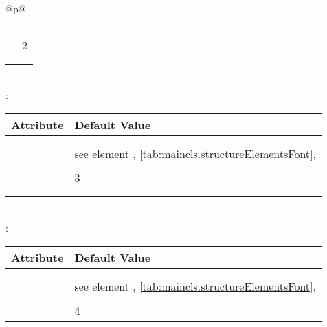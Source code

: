 \begin{longtable}{@{}p{\columnwidth}@{}}
\begin{tabularx}{\linewidth}{ll}
                           \autopageref{tab:maincls.structureElementsFont} \\
    \PValue{indent}      & \PValue{0pt} \\
    \PValue{level}       & 2 \\
    \PValue{tocindent}   & \PValue{3.8em}\\
    \PValue{tocnumwidth} & \PValue{3.2em}\\
    \bottomrule
    \end{tabularx} \\
    \addlinespace[\normalbaselineskip]
    : \\*
    \begin{tabularx}{\linewidth}{ll}
    \toprule
    Attribute & Default Value \\
    \midrule\nopagebreak
    \PValue{afterskip}   & \PValue{1.5ex plus .2ex} \\
    \PValue{beforeskip}  & \PValue{-3.25ex plus -1ex minus -.2ex} \\
    \PValue{font}        & see element \FontElement{subsubsection},
                           \autoref{tab:maincls.structureElementsFont}, 
                           \autopageref{tab:maincls.structureElementsFont} \\
    \PValue{indent}      & \PValue{0pt} \\
    \PValue{level}       & 3 \\
    \PValue{tocindent}   & \PValue{7.0em}\\
    \PValue{tocnumwidth} & \PValue{4.1em}\\
    \bottomrule
    \end{tabularx} \\
    \addlinespace[\normalbaselineskip]
    : \\*
    \begin{tabularx}{\linewidth}{ll}
    \toprule
    Attribute & Default Value \\
    \midrule\nopagebreak
    \PValue{afterskip}   & \PValue{-1em} \\
    \PValue{beforeskip}  & \PValue{3.25ex plus 1ex minus .2ex} \\
    \PValue{font}        & see element \FontElement{paragraph},
                           \autoref{tab:maincls.structureElementsFont}, 
                           \autopageref{tab:maincls.structureElementsFont} \\
    \PValue{indent}      & \PValue{0pt} \\
    \PValue{level}       & 4 \\

\end{tabularx}
\end{longtable}
